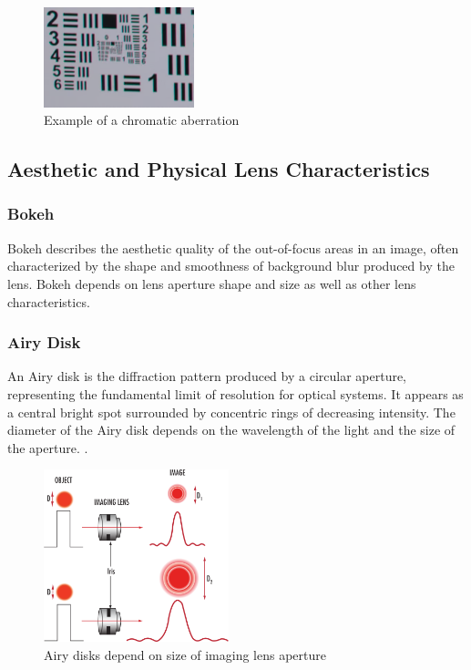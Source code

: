 \begin{figure}[h]
\centering
\includegraphics[height=2.9cm]{Images/chromatic_aberation_photo.png}
\caption{Example of a chromatic aberration \cite{ChromaticAberation}}
\label{fig:chrom_ab}
\end{figure}

\subsection{Aesthetic and Physical Lens Characteristics}

\subsubsection{Bokeh}
Bokeh describes the aesthetic quality of the out-of-focus areas in an image, often characterized by the shape and smoothness of background blur produced by the lens. Bokeh depends on lens aperture shape and size as well as other lens characteristics.

\subsubsection{Airy Disk}
An Airy disk is the diffraction pattern produced by a circular aperture, representing the fundamental limit of resolution for optical systems. It appears as a central bright spot surrounded by concentric rings of decreasing intensity. The diameter of the Airy disk depends on the wavelength of the light and the size of the aperture. \cite{AiryDisk}.

\begin{figure}[htbp]
\centering
\includegraphics[height=5cm]{Images/airy_disk.png}
\caption{Airy disks depend on size of imaging lens aperture \cite{AiryDisk}}
\label{fig:airy_disk}
\end{figure}

